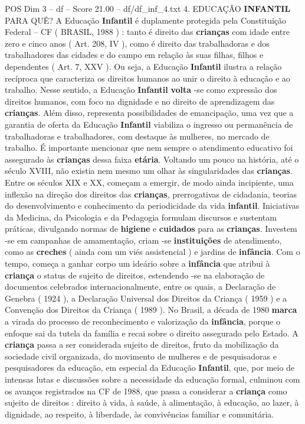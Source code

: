 \begin{textsample}{POS Dim 3 – df – Score 21.00 – df/df\_inf\_4.txt}  \label{ex:f3_pos_123}
4.
EDUCAÇÃO \textbf{INFANTIL} PARA QUÊ?
A Educação \textbf{Infantil} é duplamente protegida pela Constituição Federal – CF ( BRASIL, 1988 ) : tanto é direito das \textbf{crianças} com idade entre zero e cinco anos ( Art. 208, IV ), como é direito das trabalhadoras e dos trabalhadores das cidades e do campo em relação às suas filhas, filhos e dependentes ( Art. 7, XXV ).
Ou seja, a Educação \textbf{Infantil} ilustra a relação recíproca que caracteriza os direitos humanos ao unir o direito à educação e ao trabalho.
Nesse sentido, a Educação \textbf{Infantil} \textbf{volta} -se como expressão dos direitos humanos, com foco na dignidade e no direito de aprendizagem das \textbf{crianças}.
Além disso, representa possibilidades de emancipação, uma vez que a garantia de oferta da Educação \textbf{Infantil} viabiliza o ingresso ou permanência de trabalhadoras e trabalhadores, com destaque às mulheres, no mercado de trabalho.
É importante mencionar que nem sempre o atendimento educativo foi assegurado às \textbf{crianças} dessa faixa \textbf{etária}.
Voltando um pouco na história, até o século XVIII, não existia nem mesmo um olhar às singularidades das \textbf{crianças}.
Entre os séculos XIX e XX, começam a emergir, de modo ainda incipiente, uma inflexão na direção dos direitos das \textbf{crianças}, prerrogativas de cidadania, teorias do desenvolvimento e conhecimento da periodicidade da vida \textbf{infantil}.
Iniciativas da Medicina, da Psicologia e da Pedagogia formulam discursos e sustentam práticas, divulgando normas de \textbf{higiene} e \textbf{cuidados} para as \textbf{crianças}.
Investem -se em campanhas de amamentação, criam -se \textbf{instituições} de atendimento, como as \textbf{creches} ( ainda com um viés assistencial ) e jardins de \textbf{infância}.
Com o tempo, começa a ganhar corpo um ideário sobre a \textbf{infância} que atribui à \textbf{criança} o status de sujeito de direitos, estendendo -se na elaboração de documentos celebrados internacionalmente, entre os quais, a Declaração de Genebra ( 1924 ), a Declaração Universal dos Direitos da Criança ( 1959 ) e a Convenção dos Direitos da Criança ( 1989 ).
No Brasil, a década de 1980 \textbf{marca} a virada do processo de reconhecimento e valorização da \textbf{infância}, porque o enfoque sai da tutela da família e recai sobre o direito assegurado pelo Estado.
A \textbf{criança} passa a ser considerada sujeito de direitos, fruto da mobilização da sociedade civil organizada, do movimento de mulheres e de pesquisadoras e pesquisadores da educação, em especial da Educação \textbf{Infantil}, que, por meio de intensas lutas e discussões sobre a necessidade da educação formal, culminou com os avanços registrados na CF de 1988, que passa a considerar a \textbf{criança} como sujeito de direitos : direito à vida, à saúde, à alimentação, à educação, ao lazer, à dignidade, ao respeito, à liberdade, às convivências familiar e comunitária.

\end{textsample}

